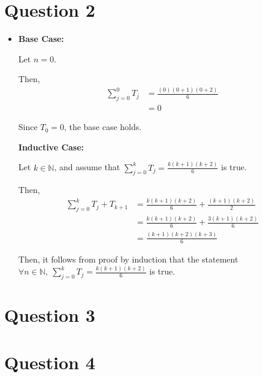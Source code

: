 \documentclass[12pt]{article}
\begin{document}
\section*{Question 2}
\begin{itemize}
    \item

    \textbf{Base Case:}

    Let $n = 0$.

    \bigskip

    Then,
    \setcounter{equation}{0}
    \begin{align}
        \sum\limits_{j=0}^0 T_j &= \frac{(0)(0 + 1)(0 + 2)}{6}\\
        &= 0
    \end{align}

    \bigskip

    Since $T_0 = 0$, the base case holds.

    \bigskip

    \textbf{Inductive Case:}

    \bigskip

    Let $k \in \mathbb{N}$, and assume that $\sum\limits_{j=0}^k T_j =
    \frac{k(k+1)(k+2)}{6}$ is true.

    \bigskip

    Then,
    \setcounter{equation}{0}
    \begin{align}
        \sum\limits_{j=0}^k T_j + T_{k+1} &= \frac{k(k+1)(k+2)}{6} + \frac{(k+1)(k+2)}{2}\\
        &= \frac{k(k+1)(k+2)}{6} + \frac{3(k+1)(k+2)}{6}\\
        &= \frac{(k+1)(k+2)(k+3)}{6}
    \end{align}

    \bigskip

    Then, it follows from proof by induction that the statement $\forall n \in
    \mathbb{N},\:\sum\limits_{j=0}^k T_j = \frac{k(k+1)(k+2)}{6}$ is true.

\end{itemize}

\section*{Question 3}

\section*{Question 4}
\end{document}
